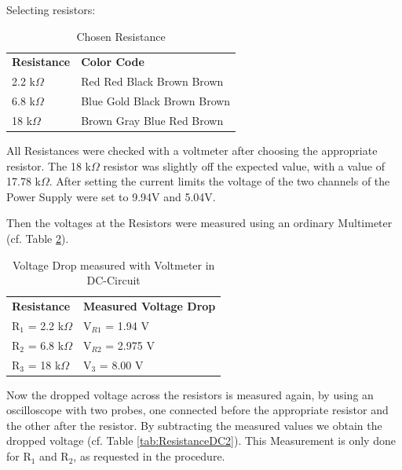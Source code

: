 Selecting resistors:
\begin{table}[h]
\centering
\caption{Chosen Resistance}
\label{tab:Resistance}
\begin{tabular}{ll}
\textbf{Resistance} & \textbf{Color Code} \\
2.2 k$\Omega$ &  Red Red Black Brown Brown \\
6.8 k$\Omega$ &  Blue Gold Black Brown Brown\\
18 k$\Omega$ &  Brown Gray Blue Red Brown                 
\end{tabular}
\end{table}
All Resistances were checked with a voltmeter after choosing the appropriate resistor. The 18 k$\Omega$ resistor was slightly off the expected value, with a value of 17.78 k$\Omega$.
\newline
After setting the current limits the voltage of the two channels of the Power Supply were set to 9.94V and 5.04V.

Then the voltages at the Resistors were measured using an ordinary Multimeter (cf. Table \ref{tab:ResistanceDC1}).

\begin{table}[h]
\centering
\caption{Voltage Drop measured with Voltmeter in DC-Circuit}
\label{tab:ResistanceDC1}
\begin{tabular}{ll}
\textbf{Resistance} & \textbf{Measured Voltage Drop} \\
R$_1$ = 2.2 k$\Omega$ &  V$_{R1}$ = 1.94 V \\
R$_2$ = 6.8 k$\Omega$ &  V$_{R2}$ = 2.975 V\\
R$_3$ = 18 k$\Omega$ &  V$_3$ = 8.00 V                
\end{tabular}
\end{table}



Now the dropped voltage across the resistors is measured again, by using an oscilloscope with two probes, one connected before the appropriate resistor and the other after the resistor. By subtracting the measured values we obtain the dropped voltage (cf. Table \ref{tab:ResistanceDC2}). This Measurement is only done for R$_1$ and R$_2$, as requested in the procedure.

